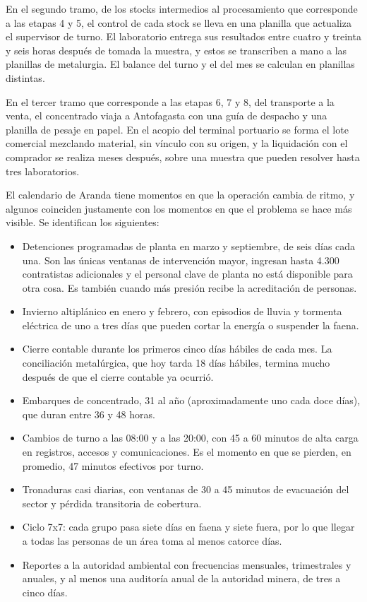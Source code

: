 \documentclass[anexo]{../../comun/overfore}
\begin{document}
En el segundo tramo, de los stocks intermedios al procesamiento que corresponde a las etapas 4 y 5, el control de cada stock se lleva en una planilla que actualiza el supervisor de turno. El laboratorio entrega sus resultados entre cuatro y treinta y seis horas después de tomada la muestra, y estos se transcriben a mano a las planillas de metalurgia. El balance del turno y el del mes se calculan en planillas distintas.

En el tercer tramo que corresponde a las etapas 6, 7 y 8, del transporte a la venta, el concentrado viaja a Antofagasta con una guía de despacho y una planilla de pesaje en papel. En el acopio del terminal portuario se forma el lote comercial mezclando material, sin vínculo con su origen, y la liquidación con el comprador se realiza meses después, sobre una muestra que pueden resolver hasta tres laboratorios.

El calendario de Aranda tiene momentos en que la operación cambia de ritmo, y algunos coinciden justamente con los momentos en que el problema se hace más visible. Se identifican los siguientes:

\begin{itemize}
\item Detenciones programadas de planta en marzo y septiembre, de seis días cada una. Son las únicas ventanas de intervención mayor, ingresan hasta 4.300 contratistas adicionales y el personal clave de planta no está disponible para otra cosa. Es también cuando más presión recibe la acreditación de personas.
\item Invierno altiplánico en enero y febrero, con episodios de lluvia y tormenta eléctrica de uno a tres días que pueden cortar la energía o suspender la faena.
\item Cierre contable durante los primeros cinco días hábiles de cada mes. La conciliación metalúrgica, que hoy tarda 18 días hábiles, termina mucho después de que el cierre contable ya ocurrió.
\item Embarques de concentrado, 31 al año (aproximadamente uno cada doce días), que duran entre 36 y 48 horas.
\item Cambios de turno a las 08:00 y a las 20:00, con 45 a 60 minutos de alta carga en registros, accesos y comunicaciones. Es el momento en que se pierden, en promedio, 47 minutos efectivos por turno.
\item Tronaduras casi diarias, con ventanas de 30 a 45 minutos de evacuación del sector y pérdida transitoria de cobertura.
\item Ciclo 7x7: cada grupo pasa siete días en faena y siete fuera, por lo que llegar a todas las personas de un área toma al menos catorce días.
\item Reportes a la autoridad ambiental con frecuencias mensuales, trimestrales y anuales, y al menos una auditoría anual de la autoridad minera, de tres a cinco días.
\end{itemize}
\end{document}
